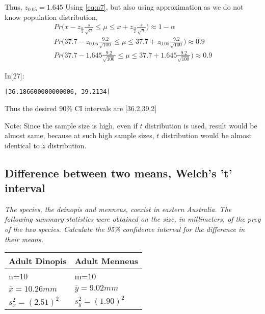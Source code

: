 \documentclass[float=false,crop=false]{standalone}
\begin{document}
    Thus, \(z_{0.05} = 1.645\)
Using \ref{eq:n7}, but also using approximation as we do not know population distribution,
    \[
\begin{aligned}
    Pr\Big( x - z_{\frac{\alpha}{2}}\frac{s}{\sqrt{n}} \leq \mu \leq x + z_{\frac{\alpha}{2}}\frac{s}{\sqrt{n}}\Big) \approx 1-\alpha \nonumber \\
    Pr\Big( 37.7 - z_{0.05}\frac{9.2}{\sqrt{100}} \leq \mu \leq 37.7 + z_{0.05}\frac{9.2}{\sqrt{100}}\Big) \approx 0.9 \nonumber \\
    Pr\Big( 37.7 - 1.645\frac{9.2}{\sqrt{100}} \leq \mu \leq 37.7 + 1.645\frac{9.2}{\sqrt{100}}\Big) \approx 0.9 
\end{aligned}
\]
\begin{InVerbatim}[commandchars=\\\{\},fontsize=\scriptsize]
{\color{incolor}In[{\color{incolor}27}]:}         
            
\end{InVerbatim}
    \begin{Verbatim}[commandchars=\\\{\},fontsize=\footnotesize]
[36.186600000000006, 39.2134]

    \end{Verbatim}

    Thus the desired 90\% CI intervals are {[}36.2,39.2{]}

Note: Since the sample size is high, even if \(t\) distribution is used,
result would be almost same, because at such high sample sizes, \(t\)
distribution would be almost identical to \(z\) distribution.

    \subsection{Difference between two means, Welch's 't'
interval}\label{difference-between-two-means-welchs-t-interval}

    \emph{The species, the deinopis and menneus, coexist in eastern
Australia. The following summary statistics were obtained on the size,
in millimeters, of the prey of the two species. Calculate the 95\%
confidence interval for the difference in their means. }

\begin{longtable}[]{@{}ll@{}}
\toprule
Adult Dinopis & Adult Menneus\tabularnewline
\midrule
\endhead
n=10 & m=10\tabularnewline
\(\overline{x}=10.26 mm\) & \(\overline{y}=9.02 mm\)\tabularnewline
\(s^2_x = (2.51)^2\) & \(s^2_y = (1.90)^2\)\tabularnewline
\bottomrule
\end{longtable}
\end{document}
